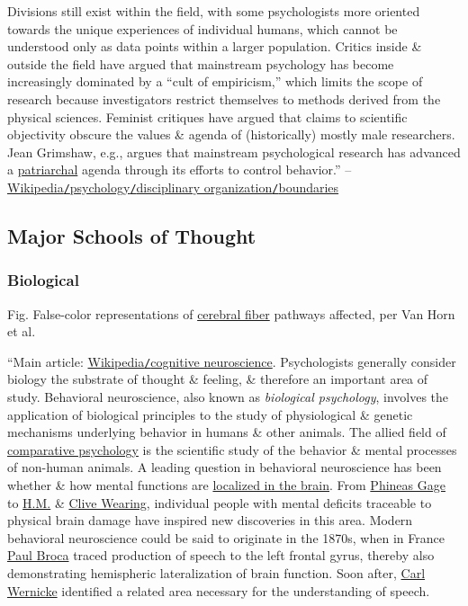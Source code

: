 \documentclass[oneside]{book}
\numberwithin{equation}{section}
\begin{document}
Divisions still exist within the field, with some psychologists more oriented towards the unique experiences of individual humans, which cannot be understood only as data points within a larger population. Critics inside \& outside the field have argued that mainstream psychology has become increasingly dominated by a ``cult of empiricism,'' which limits the scope of research because investigators restrict themselves to methods derived from the physical sciences. Feminist critiques have argued that claims to scientific objectivity obscure the values \& agenda of (historically) mostly male researchers. Jean Grimshaw, e.g., argues that mainstream psychological research has advanced a \href{https://en.wikipedia.org/wiki/Patriarchal}{patriarchal} agenda through its efforts to control behavior.'' -- \href{https://en.wikipedia.org/wiki/Psychology#Boundaries}{Wikipedia\texttt{/}psychology\texttt{/}disciplinary organization\texttt{/}boundaries}

\subsection{Major Schools of Thought}

\subsubsection{Biological}
\textsf{Fig. False-color representations of \href{https://en.wikipedia.org/wiki/White_matter}{cerebral fiber} pathways affected, per Van Horn et al.}

``Main article: \href{https://en.wikipedia.org/wiki/Cognitive_neuroscience}{Wikipedia\texttt{/}cognitive neuroscience}. Psychologists generally consider biology the substrate of thought \& feeling, \& therefore an important area of study. Behavioral neuroscience, also known as \textit{biological psychology}, involves the application of biological principles to the study of physiological \& genetic mechanisms underlying behavior in humans \& other animals. The allied field of \href{https://en.wikipedia.org/wiki/Comparative_psychology}{comparative psychology} is the scientific study of the behavior \& mental processes of non-human animals. A leading question in behavioral neuroscience has been whether \& how mental functions are \href{https://en.wikipedia.org/wiki/Functional_specialization_(brain)}{localized in the brain}. From \href{https://en.wikipedia.org/wiki/Phineas_Gage}{Phineas Gage} to \href{https://en.wikipedia.org/wiki/Henry_Molaison}{H.M.} \& \href{https://en.wikipedia.org/wiki/Clive_Wearing}{Clive Wearing}, individual people with mental deficits traceable to physical brain damage have inspired new discoveries in this area. Modern behavioral neuroscience could be said to originate in the 1870s, when in France \href{https://en.wikipedia.org/wiki/Paul_Broca}{Paul Broca} traced production of speech to the left frontal gyrus, thereby also demonstrating hemispheric lateralization of brain function. Soon after, \href{https://en.wikipedia.org/wiki/Carl_Wernicke}{Carl Wernicke} identified a related area necessary for the understanding of speech.
\end{document}
